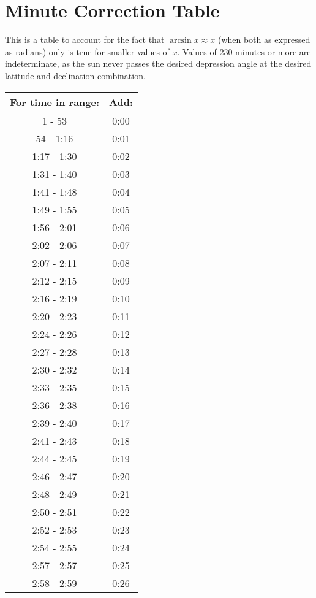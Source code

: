\section{Minute Correction Table}

This is a table to account for the fact that $\arcsin x \approx x$ (when both as expressed as radians) only is true for smaller values of $x$. Values of 230 minutes or more are indeterminate, as the sun never passes the desired depression angle at the desired latitude and declination combination.

	\begin{minipage}{0.5\textwidth}
\begin{tabular}[t]{c|c}
	For time in range: & Add: \\\hline
	1 - 53 & 0:00 \\\hline
	54 - 1:16 & 0:01 \\\hline
	1:17 - 1:30 & 0:02 \\\hline
	1:31 - 1:40 & 0:03 \\\hline
	1:41 - 1:48 & 0:04 \\\hline
	1:49 - 1:55 & 0:05 \\\hline
	1:56 - 2:01 & 0:06 \\\hline
	2:02 - 2:06 & 0:07 \\\hline
	2:07 - 2:11 & 0:08 \\\hline
	2:12 - 2:15 & 0:09 \\\hline
	2:16 - 2:19 & 0:10 \\\hline
	2:20 - 2:23 & 0:11 \\\hline
	2:24 - 2:26 & 0:12 \\\hline
	2:27 - 2:28 & 0:13 \\\hline
	2:30 - 2:32 & 0:14 \\\hline
	2:33 - 2:35 & 0:15 \\\hline
	2:36 - 2:38 & 0:16 \\\hline
	2:39 - 2:40 & 0:17 \\\hline
	2:41 - 2:43 & 0:18 \\\hline
	2:44 - 2:45 & 0:19 \\\hline
	2:46 - 2:47 & 0:20 \\\hline
	2:48 - 2:49 & 0:21 \\\hline
	2:50 - 2:51 & 0:22 \\\hline
	2:52 - 2:53 & 0:23 \\\hline
	2:54 - 2:55 & 0:24 \\\hline
	2:57 - 2:57 & 0:25 \\\hline
	2:58 - 2:59 & 0:26 \\\hline

\end{tabular}
\end{minipage}
